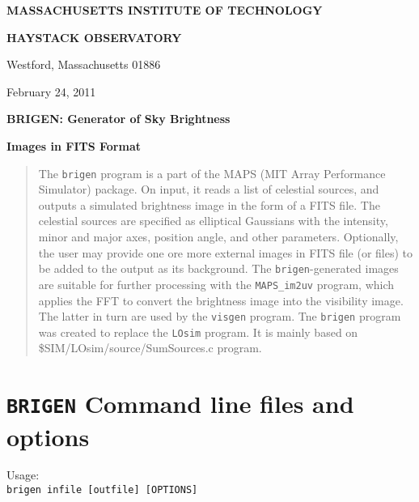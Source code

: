 \documentclass[letterpaper, oneside, 11pt]{article}
\author{Leonid Benkevitch}
\begin{document}
\centerline{\large\bf MASSACHUSETTS INSTITUTE OF TECHNOLOGY}
\centerline{\large\bf HAYSTACK OBSERVATORY}
\smallskip
\centerline{\normalsize Westford, Massachusetts 01886}
\bigskip
\centerline{February 24, 2011}
\bigskip
\bigskip
\bigskip
\centerline{\LARGE\bf BRIGEN: Generator of Sky Brightness}
\centerline{\LARGE\bf Images in FITS Format}


\begin{abstract}
The {\tt brigen} program is a part of the MAPS (MIT Array Performance Simulator) package. On input, it reads a list of celestial sources, and outputs a simulated brightness image in the form of a FITS file. The celestial sources are specified as elliptical Gaussians with the intensity, minor and major axes, position angle, and other parameters. Optionally, the user may provide one ore more external images in FITS file (or files) to be added to the output as its background. The {\tt brigen}-generated images are suitable for  further processing with the {\tt MAPS\_im2uv} program, which applies the FFT to convert the brightness image into the visibility image. The latter in turn are used by the {\tt visgen} program. Tne {\tt brigen} program was created to replace the {\tt LOsim} program. It is mainly based on \$SIM/LOsim/source/SumSources.c program.
\end{abstract}

\section{{\tt BRIGEN} Command line files and options}

Usage:\\
{\tt brigen infile [outfile] [OPTIONS]}\\
\end{document}
